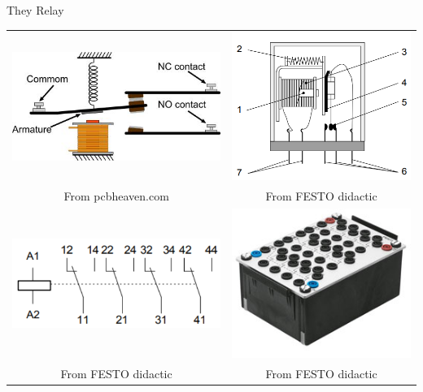 \documentclass[presentation,aspectratio=1610]{beamer}
\begin{document}
\begin{frame}[label={sec:orgbaf4c84}]{They Relay}
\begin{center}
\begin{tabular}{cc}
\includegraphics[width=0.4\linewidth]{../../figures/howrelayswork.jpg} &
\includegraphics[width=0.3\linewidth]{../../figures/festo-relay-principle.png}\\
{\tiny From pcbheaven.com} & {\tiny From FESTO didactic}\\
\includegraphics[width=0.35\linewidth]{../../figures/festo-relay-switches.png} &
\includegraphics[width=0.25\linewidth]{../../figures/festo-relay-box.jpg}\\
{\tiny From FESTO didactic} & {\tiny From FESTO didactic}\\
\end{tabular}
\end{center}
\end{frame}
\end{document}
